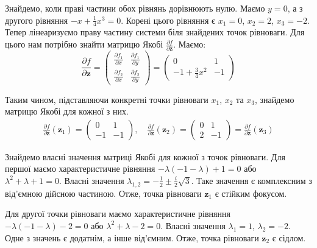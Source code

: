 \documentclass{hw_template}
\begin{document}
Знайдемо, коли праві частини обох рівнянь дорівнюють нулю. Маємо $y=0$, а з
другого рівняння $-x + \frac{1}{4}x^3 = 0$. Корені цього рівняння є $x_1 = 0$,
$x_2=2$, $x_3 = -2$. Тепер лінеаризуємо праву частину системи біля
знайдених точок рівноваги. Для цього нам потрібно знайти матрицю Якобі
$\frac{\partial f}{\partial \mathbf{z}}$. Маємо:
\begin{equation*}
    \frac{\partial f}{\partial \mathbf
    {z}} =
    \begin{pmatrix}
        \frac{\partial f_1}{\partial x} & \frac{\partial f_1}{\partial y} \\
        \frac{\partial f_2}{\partial x} & \frac{\partial f_2}{\partial y}
    \end{pmatrix} = 
    \begin{pmatrix}
        0 & 1 \\
        -1 + \frac{3}{4}x^2 & -1
    \end{pmatrix}
\end{equation*}

Таким чином, підставляючи конкретні точки рівноваги $x_1$, $x_2$ та $x_3$,
знайдемо матрицю Якобі для кожної з них.
\begin{gather*}
    \frac{\partial f}{\partial \mathbf{z}}(\mathbf{z}_1) = 
    \begin{pmatrix}
        0 & 1 \\
        -1 & -1
    \end{pmatrix}, \quad
    \frac{\partial f}{\partial \mathbf{z}}(\mathbf{z}_2) = 
    \begin{pmatrix}
        0 & 1 \\
        2 & -1
    \end{pmatrix} =
    \frac{\partial f}{\partial \mathbf{z}}(\mathbf{z}_3)
\end{gather*}

Знайдемо власні значення матриці Якобі для кожної з точок рівноваги. Для
першої маємо характеристичне рівняння $-\lambda(-1-\lambda) + 1 = 0$ або
$\lambda^2 + \lambda + 1 = 0$. Власні значення $\lambda_{1,2} =
-\frac{1}{2} \pm \frac{i}{2}\sqrt{3}$. Таке значення є комплексним з
від'ємною дійсною частиною. Отже, точка рівноваги $\mathbf{z}_1$ є стійким 
фокусом.

Для другої точки рівноваги маємо характеристичне рівняння
$-\lambda(-1-\lambda) - 2 = 0$ або $\lambda^2 + \lambda - 2 = 0$. Власні
значення $\lambda_1=1$, $\lambda_2=-2$. Одне з значень є додатнім, а інше
від'ємним. Отже, точка рівноваги $\mathbf{z}_2$ є сідлом.
\end{document}
